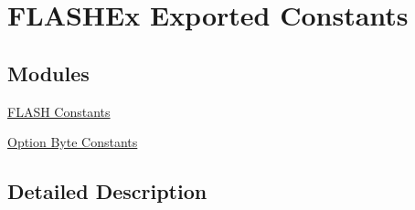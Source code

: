 \hypertarget{group___f_l_a_s_h_ex___exported___constants}{}\section{F\+L\+A\+S\+H\+Ex Exported Constants}
\label{group___f_l_a_s_h_ex___exported___constants}
\subsection*{Modules}
\begin{DoxyCompactItemize}
\item 
\hyperlink{group___f_l_a_s_h_ex___constants}{F\+L\+A\+S\+H Constants}
\item 
\hyperlink{group___f_l_a_s_h_ex___option_byte___constants}{Option Byte Constants}
\end{DoxyCompactItemize}


\subsection{Detailed Description}
